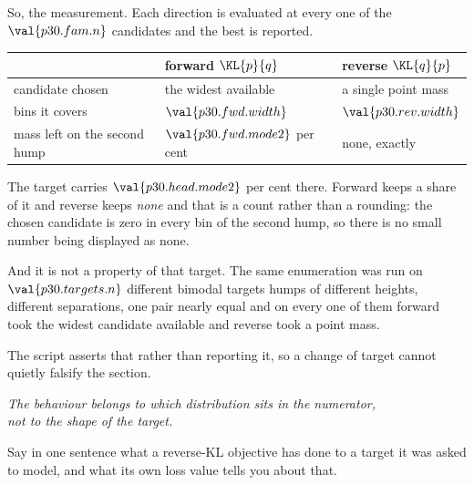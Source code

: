 \begin{fr}
So, the measurement. Each direction is evaluated at every one of the
$\val{p30.fam.n}$ candidates and the best is reported.

\begin{center}
\begin{tabularx}{\linewidth}{@{}lXX@{}}
\toprule
& \textbf{forward} $\KL{p}{q}$ & \textbf{reverse} $\KL{q}{p}$ \\
\midrule
candidate chosen & the widest available & a single point mass \\
bins it covers & $\val{p30.fwd.width}$ & $\val{p30.rev.width}$ \\
mass left on the second hump & $\val{p30.fwd.mode2}$ per cent & none, exactly \\
\bottomrule
\end{tabularx}
\end{center}

The target carries $\val{p30.head.mode2}$ per cent there. Forward keeps a
share of it and reverse keeps \emph{none} \dash{} and that is a count rather
than a rounding: the chosen candidate is zero in every bin of the second
hump, so there is no small number being displayed as none.
\end{fr}

\begin{fr}
And it is not a property of that target. The same enumeration was run on
$\val{p30.targets.n}$ different bimodal targets \dash{} humps of different
heights, different separations, one pair nearly equal \dash{} and on every
one of them forward took the widest candidate available and reverse took a
point mass.

The script asserts that rather than reporting it, so a change of target
cannot quietly falsify the section.

\begin{center}
\emph{The behaviour belongs to which distribution sits in the numerator,\\
not to the shape of the target.}
\end{center}

Say in one sentence what a reverse-KL objective has done to a target it was
asked to model, and what its own loss value tells you about that.
\dotline
\nextframe
\end{fr}

